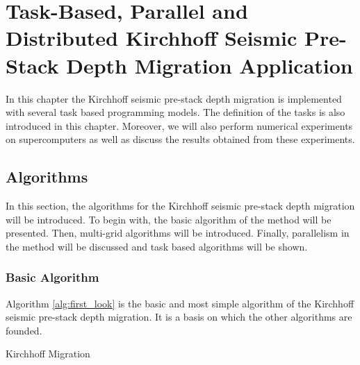 \chapter{Task-Based, Parallel and Distributed Kirchhoff Seismic Pre-Stack Depth Migration Application \label{chap:exp_km}}
\graphicspath{{chapters/exp_kirchhoff/}}


In this chapter the Kirchhoff seismic pre-stack depth migration is implemented with several task based programming models.
The definition of the tasks is also introduced in this chapter.
Moreover, we will also perform numerical experiments on supercomputers as well as discuss the results obtained from these experiments.

\section{Algorithms}
In this section, the algorithms for the  Kirchhoff seismic pre-stack depth migration will be introduced.
To begin with, the basic algorithm of the method will be presented.
Then, multi-grid algorithms will be introduced.
Finally, parallelism in the method will be discussed and task based algorithms will be shown.

\subsection{Basic Algorithm}

Algorithm \ref{alg:first_look} is the basic and most simple algorithm of the Kirchhoff seismic pre-stack depth migration.
It is a basis on which the other algorithms are founded.


\begin{algorithm}[h]
	\DontPrintSemicolon
	\SetAlgoVlined
	\caption{Kirchhoff Migration \label{alg:first_look}}
\end{algorithm}

